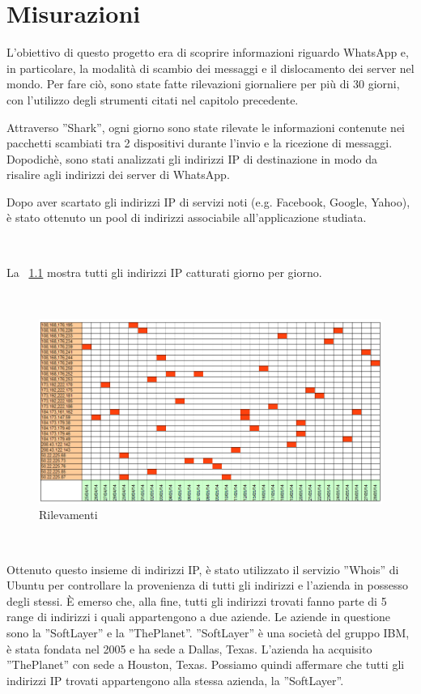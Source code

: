 \documentclass[a4paper,11pt]{book}
\begin{document}
\chapter{Misurazioni}

L'obiettivo di questo progetto era di scoprire informazioni riguardo WhatsApp e, in particolare, la modalità di scambio dei messaggi e il dislocamento dei server nel mondo.
Per fare ci\`o, sono state fatte rilevazioni giornaliere per pi\`u di 30 giorni, con l'utilizzo degli strumenti citati nel capitolo precedente.

Attraverso ''Shark'', ogni giorno sono state rilevate le informazioni contenute nei pacchetti scambiati tra 2 dispositivi durante l'invio e la ricezione di messaggi.
Dopodich\`e, sono stati analizzati gli indirizzi IP di destinazione in modo da risalire agli indirizzi dei server di WhatsApp.

Dopo aver scartato gli indirizzi IP di servizi noti (e.g. Facebook, Google, Yahoo), è stato ottenuto un pool di indirizzi associabile all'applicazione studiata.

~

La \figurename ~\ref{fig:rilevazioni} mostra tutti gli indirizzi IP catturati giorno per giorno.  

~

\begin{figure}[!ht]
\centering
\includegraphics[scale = 0.7]{rilevazioni_30gg.png}
\caption{Rilevamenti}
\label{fig:rilevazioni}
\end{figure}

~

Ottenuto questo insieme di indirizzi IP, \`e stato utilizzato il servizio ''Whois'' di Ubuntu per controllare la provenienza di tutti gli indirizzi e l'azienda in possesso degli stessi.
\`E emerso che, alla fine, tutti gli indirizzi trovati fanno parte di 5 range di indirizzi i quali appartengono a due aziende. Le aziende in questione sono la ''SoftLayer'' e la ''ThePlanet''.
''SoftLayer'' \`e una societ\`a del gruppo IBM, \`e stata fondata nel 2005 e ha sede a Dallas, Texas. L'azienda ha acquisito ''ThePlanet'' con sede a Houston, Texas. 
Possiamo quindi affermare che tutti gli indirizzi IP trovati appartengono alla stessa azienda, la ''SoftLayer''.
\end{document}
